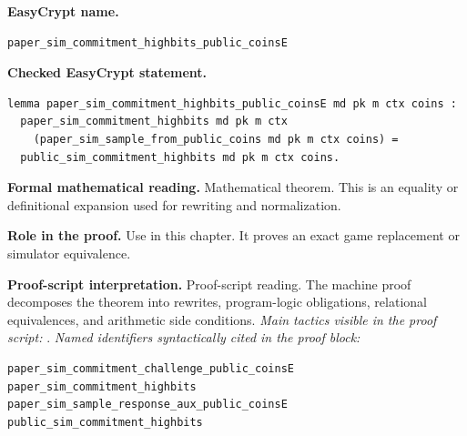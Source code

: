 \begin{formaltheorem}
\noindent\textbf{EasyCrypt name.}
\begin{lstlisting}[language=EasyCrypt,basicstyle=\ttfamily\scriptsize]
paper_sim_commitment_highbits_public_coinsE
\end{lstlisting}
\noindent\textbf{Checked EasyCrypt statement.}
\begin{lstlisting}[language=EasyCrypt,basicstyle=\ttfamily\scriptsize]
lemma paper_sim_commitment_highbits_public_coinsE md pk m ctx coins :
  paper_sim_commitment_highbits md pk m ctx
    (paper_sim_sample_from_public_coins md pk m ctx coins) =
  public_sim_commitment_highbits md pk m ctx coins.
\end{lstlisting}
\noindent\textbf{Formal mathematical reading.}
Mathematical theorem. This is an equality or definitional expansion used for rewriting and normalization.

\noindent\textbf{Role in the proof.}
Use in this chapter. It proves an exact game replacement or simulator equivalence.

\noindent\textbf{Proof-script interpretation.}
Proof-script reading. The machine proof decomposes the theorem into rewrites, program-logic obligations, relational equivalences, and arithmetic side conditions.
\emph{Main tactics visible in the proof script:} .
\emph{Named identifiers syntactically cited in the proof block:}
\begin{lstlisting}[language=EasyCrypt,basicstyle=\ttfamily\scriptsize]
paper_sim_commitment_challenge_public_coinsE
paper_sim_commitment_highbits
paper_sim_sample_response_aux_public_coinsE
public_sim_commitment_highbits
\end{lstlisting}

\end{formaltheorem}

